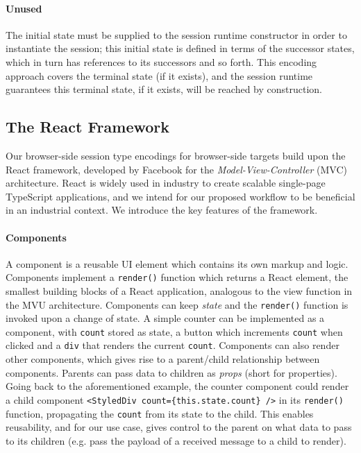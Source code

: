 \paragraph{Unused}
The initial state must be supplied to the session runtime
constructor in order to instantiate the session;
this initial state is defined
in terms of the successor states, which in turn has references to its
successors and so forth.
This encoding approach covers the terminal state (if it exists), and the
session runtime guarantees this terminal state, if it exists, will be reached
by construction.

\subsection{The React Framework}
Our browser-side session type encodings for browser-side targets build upon the React framework, developed by Facebook \cite{React} for the \textit{Model-View-Controller} (MVC) architecture. React is widely used in industry to create scalable single-page TypeScript
applications, and we intend for our proposed workflow to be beneficial in an
industrial context.
We introduce the key features of the framework.

\paragraph{Components}
A component is a reusable UI element which
contains its own markup and logic.
Components implement a \texttt{render()} function which returns a React
element, the smallest building blocks of a React application, analogous to the
view function in the MVU architecture.
Components can keep \textit{state} and the \texttt{render()} function is
invoked upon a change of state.
A simple counter can be implemented as a component,
with \texttt{count} stored as state, a button which increments \texttt{count}
when clicked and a \texttt{div} that renders the current
\texttt{count}.
Components can also render other components, which gives rise
to a parent/child relationship between components.
Parents can pass data to children as \textit{props} (short for properties).
Going back to the aforementioned example, the counter component could
render a child component \texttt{<StyledDiv count=\{this.state.count\} />} in
its \texttt{render()} function, propagating the \texttt{count} from its state
to the child.
This enables reusability, and for our use case, gives control to the parent
on what data to pass to its children (e.g. pass the payload of a received
message to a child to render).

